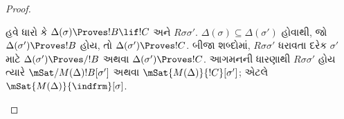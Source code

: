 \documentclass[../../../include/open-logic-section]{subfiles}
\begin{document}
\begin{proof}
\begin{enumerate}
{        હવે ધારો કે $\Delta(\sigma) \Proves !B \lif !C$
        અને $R\sigma\sigma'$. $\Delta(\sigma) \subseteq
        \Delta(\sigma')$ હોવાથી, જો
        $\Delta(\sigma') \Proves !B$ હોય, તો
        $\Delta(\sigma') \Proves !C$. બીજા શબ્દોમાં,
        $R\sigma\sigma'$ ધરાવતા દરેક $\sigma'$ માટે
        $\Delta(\sigma') \Proves/ !B$ અથવા
        $\Delta(\sigma') \Proves !C$. આગમનની ધારણાથી
        $R\sigma\sigma'$ હોય ત્યારે
        $\mSat/{M(\Delta)}{!B}[\sigma']$ અથવા
        $\mSat{M(\Delta)}{!C}[\sigma']$;
        એટલે $\mSat{M(\Delta)}{\indfrm}[\sigma]$.}
  \end{enumerate}
\end{proof}
\end{document}
